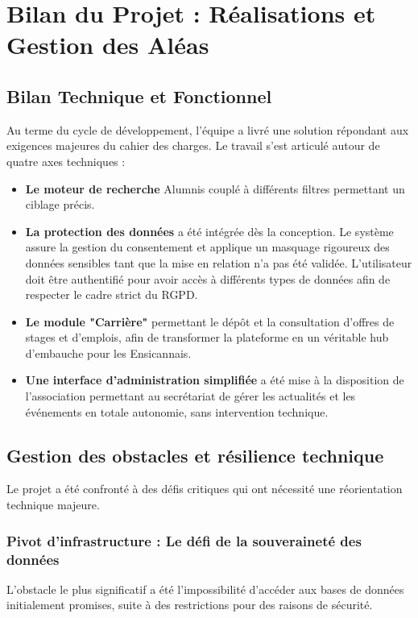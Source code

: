 \documentclass[a4paper,12pt]{article}
\begin{document}
\newpage

\section{Bilan du Projet : Réalisations et Gestion des Aléas}

\subsection{Bilan Technique et Fonctionnel}
Au terme du cycle de développement, l'équipe a livré une solution répondant aux exigences majeures du cahier des charges. Le travail s'est articulé autour de quatre axes techniques :

\begin{itemize}[label=\textbullet, itemsep=5pt]
    \item \textbf{Le moteur de recherche} Alumnis couplé à différents filtres permettant un ciblage précis.
    \item \textbf{La protection des données} a été intégrée dès la conception. Le système assure la gestion du consentement et applique un masquage rigoureux des données sensibles tant que la mise en relation n'a pas été validée. L’utilisateur doit être authentifié pour avoir accès à différents types de données afin de respecter le cadre strict du RGPD.
    \item \textbf{Le module "Carrière"} permettant le dépôt et la consultation d'offres de stages et d'emplois, afin de transformer la plateforme en un véritable hub d’embauche pour les Ensicannais.
    \item \textbf{Une interface d'administration simplifiée} a été mise à la disposition de l'association permettant au secrétariat de gérer les actualités et les événements en totale autonomie, sans intervention technique.
\end{itemize}

\subsection{Gestion des obstacles et résilience technique}
Le projet a été confronté à des défis critiques qui ont nécessité une réorientation technique majeure.

\subsubsection{Pivot d'infrastructure : Le défi de la souveraineté des données}
L'obstacle le plus significatif a été l'impossibilité d'accéder aux bases de données initialement promises, suite à des restrictions pour des raisons de sécurité.
\end{document}
